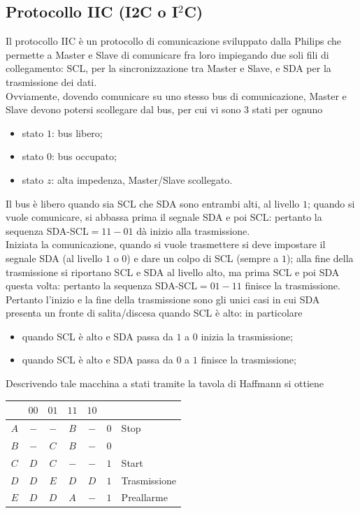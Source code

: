 \documentclass[a4paper]{extarticle}
\renewcommand\arraystretch{}
\begin{document}
\subsection{Protocollo IIC (I2C o I$^2$C)}
Il protocollo IIC è un protocollo di comunicazione sviluppato dalla Philips che permette a Master e Slave di comunicare fra loro impiegando due soli fili di collegamento: SCL, per la sincronizzazione tra Master e Slave, e SDA per la trasmissione dei dati.\\
Ovviamente, dovendo comunicare su uno stesso bus di comunicazione, Master e Slave devono potersi scollegare dal bus, per cui vi sono $3$ stati per ognuno
\begin{itemize}
    \item stato $1$: bus libero;
    \item stato $0$: bus occupato;
    \item stato $z$: alta impedenza, Master/Slave scollegato.
\end{itemize}
Il bus è libero quando sia SCL che SDA sono entrambi alti, al livello $1$; quando si vuole comunicare, si abbassa prima il segnale SDA e poi SCL: pertanto la sequenza SDA-SCL$=11-01$ dà inizio alla trasmissione.\\
Iniziata la comunicazione, quando si vuole trasmettere si deve impostare il segnale SDA (al livello $1$ o $0$) e dare un colpo di SCL (sempre a $1$); alla fine della trasmissione si riportano SCL e SDA al livello alto, ma prima SCL e poi SDA questa volta: pertanto la sequenza SDA-SCL$=01-11$ finisce la trasmissione.\\
Pertanto l'inizio e la fine della trasmissione sono gli unici casi in cui SDA presenta un fronte di salita/discesa quando SCL è alto: in particolare
\begin{itemize}
    \item quando SCL è alto e SDA passa da $1$ a $0$ inizia la trasmissione;
    \item quando SCL è alto e SDA passa da $0$ a $1$ finisce la trasmissione;
\end{itemize}
Descrivendo tale macchina a stati tramite la tavola di Haffmann si ottiene

\vspace{1em}
\noindent
\begin{table}[H]
\setlength{\tabcolsep}{4pt}
\renewcommand{\arraystretch}{1.2}
\centering
\begin{tabular}{c|cccc|cl}
        & $00$ & $01$ & $11$ & $10$ & & \\
    \hline
    $A$ & $-$         & $-$          & $B$          & $-$         & $0$ & Stop\\ 
    $B$ & $-$         & $C$          & $\boxed{B}$  & $-$         & $0$ & \\
    $C$ & $D$         & $\boxed{C}$  & $-$          & $-$         & $1$ & Start\\
    $D$ & $\boxed{D}$ & $E$          & $\boxed{D}$  & $\boxed{D}$ & $1$ & Trasmissione\\
    $E$ & $D$         & $\boxed{D}$  & $A$          & $-$         & $1$ & Preallarme\\
\end{tabular}
\end{table}
\end{document}
